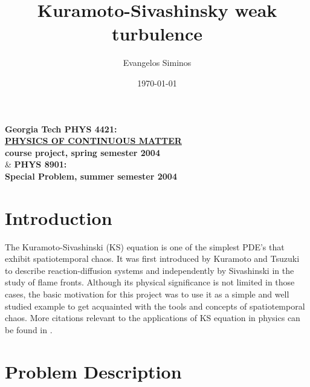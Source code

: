 \documentclass[pre,preprint,groupedaddress,showpacs,showkeys]{revtex4}
\begin{document}
                \title{
                    Kuramoto-Sivashinsky weak turbulence
                }
                \author{
                            Evangelos Siminos
                        }


                \date{\today} %


                    \maketitle

\noindent
{\bf Georgia Tech PHYS 4421:}\\
\underline{\bf PHYSICS OF CONTINUOUS MATTER }\\
{\bf course project, spring semester 2004} \\
\& {\bf  PHYS 8901:}\\
{\bf Special Problem, summer semester 2004}

\section{Introduction}

The Kuramoto-Sivashinski (KS) equation is one of the simplest PDE's that
exhibit spatiotemporal chaos. It was first introduced by Kuramoto and
Tsuzuki \cite{Kuramoto:76} to describe reaction-diffusion systems and independently by
Sivashinski \cite{Sivashinsky:77} in the study of flame fronts. Although its physical
significance is not limited in those cases, the basic motivation for
this project was to use it as a simple and well studied example to get
acquainted with the tools and concepts of spatiotemporal
chaos. More citations relevant to the applications of KS equation in
physics can be found in \cite{Lan:Thesis}.

\section{Problem Description}
\label{sec:der}
\end{document}
